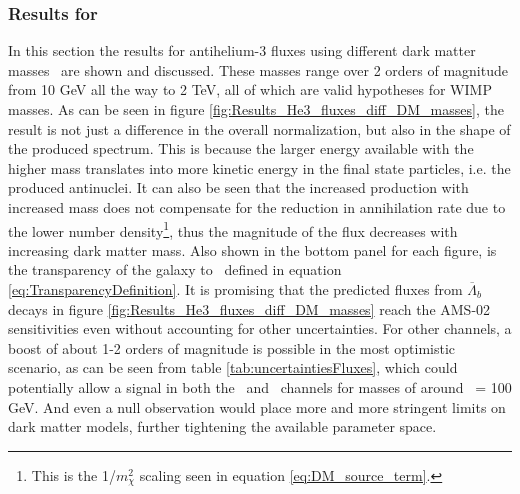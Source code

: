 \subsubsection{Results for \ahe\ }
In this section the results for antihelium-3 fluxes using different dark matter masses \dmm\ are shown and discussed. These masses range over 2 orders of magnitude from 10 GeV all the way to 2 TeV, all of which are valid hypotheses for WIMP masses. As can be seen in figure \ref{fig:Results_He3_fluxes_diff_DM_masses}, the result is not just a difference in the overall normalization, but also in the shape of the produced spectrum. This is because the larger energy available with the higher mass translates into more kinetic energy in the final state particles, i.e. the produced antinuclei. It can also be seen that the increased production with increased mass does not compensate for the reduction in annihilation rate due to the lower number density\footnote{This is the 1/$m_\chi^2$ scaling seen in equation \ref{eq:DM_source_term}.}, thus the magnitude of the flux decreases with increasing dark matter mass. Also shown in the bottom panel for each figure, is the transparency of the galaxy to \ahe\, defined in equation \ref{eq:TransparencyDefinition}. It is promising that the predicted fluxes from $\overline{\Lambda}_b$ decays in figure \ref{fig:Results_He3_fluxes_diff_DM_masses} reach the AMS-02 sensitivities even without accounting for other uncertainties. For other channels, a boost of about 1-2 orders of magnitude is possible in the most optimistic scenario, as can be seen from table \ref{tab:uncertaintiesFluxes}, which could potentially allow a signal in both the \bb\ and \WW\ channels for masses of around \dmm\ = 100 GeV. And even a null observation would place more and more stringent limits on dark matter models, further tightening the available parameter space. 

